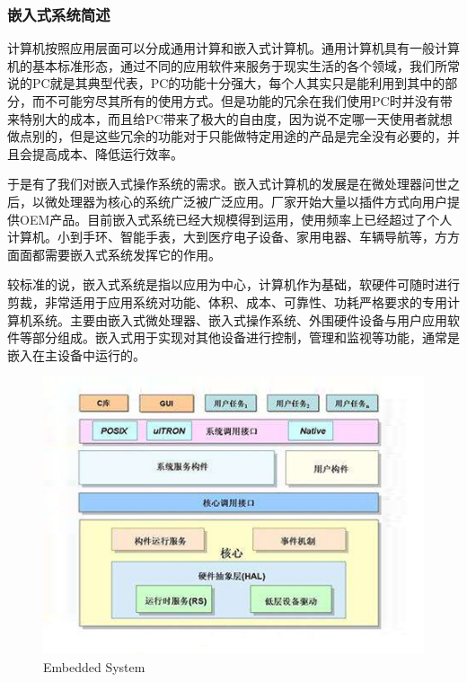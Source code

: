 \documentclass[12pt, a4paper]{article}
\begin{document}
	\subsubsection{嵌入式系统简述}
	计算机按照应用层面可以分成通用计算和嵌入式计算机。通用计算机具有一般计算机的基本标准形态，通过不同的应用软件来服务于现实生活的各个领域，我们所常说的PC就是其典型代表，PC的功能十分强大，每个人其实只是能利用到其中的部分，而不可能穷尽其所有的使用方式。但是功能的冗余在我们使用PC时并没有带来特别大的成本，而且给PC带来了极大的自由度，因为说不定哪一天使用者就想做点别的，但是这些冗余的功能对于只能做特定用途的产品是完全没有必要的，并且会提高成本、降低运行效率。  
	
	于是有了我们对嵌入式操作系统的需求。嵌入式计算机的发展是在微处理器问世之后，以微处理器为核心的系统广泛被广泛应用。厂家开始大量以插件方式向用户提供OEM产品。目前嵌入式系统已经大规模得到运用，使用频率上已经超过了个人计算机。小到手环、智能手表，大到医疗电子设备、家用电器、车辆导航等，方方面面都需要嵌入式系统发挥它的作用。  
	
	较标准的说，嵌入式系统是指以应用为中心，计算机作为基础，软硬件可随时进行剪裁，非常适用于应用系统对功能、体积、成本、可靠性、功耗严格要求的专用计算机系统。主要由嵌入式微处理器、嵌入式操作系统、外围硬件设备与用户应用软件等部分组成。嵌入式用于实现对其他设备进行控制，管理和监视等功能，通常是嵌入在主设备中运行的。
	
	\begin{figure}
	\centering
	\includegraphics[width=0.7\linewidth]{R1}
	\caption{Embedded System}
	\label{Embedded System}
	\end{figure}
\end{document}
